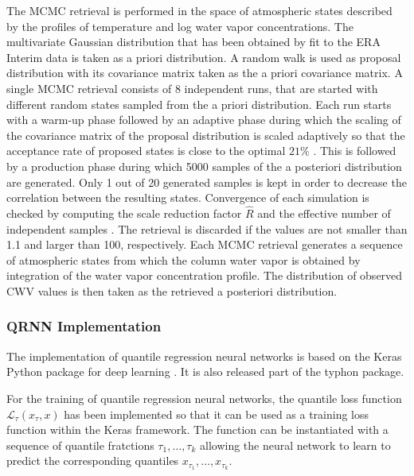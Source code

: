 \documentclass[journal abbreviation, manuscript]{copernicus}
\begin{document}
  The MCMC retrieval is performed in the space of atmospheric states described
  by the profiles of temperature and log water vapor concentrations. The
  multivariate Gaussian distribution that has been obtained by fit to the ERA
  Interim data is taken as a priori distribution. A random walk is used as
  proposal distribution with its covariance matrix taken as the a priori
  covariance matrix. A single MCMC retrieval consists of 8 independent runs,
  that are started with different random states sampled from the a priori
  distribution. Each run starts with a warm-up phase followed by an adaptive
  phase during which the scaling of the covariance matrix of the proposal
  distribution is scaled adaptively so that the acceptance rate of proposed states is
  close to the optimal $21\%$ \citep{bda}. This is followed by a production
  phase during which 5000 samples of the a posteriori distribution are
  generated. Only 1 out of 20 generated samples is kept in order to decrease the
  correlation between the resulting states. Convergence of each simulation is
  checked by computing the scale reduction factor $\hat{R}$ and the effective
  number of independent samples \citep[eqs. (11.12), (11.13)]{bda}. The
  retrieval is discarded if the values are not smaller than 1.1 and larger than
  100, respectively. Each MCMC retrieval generates a sequence of atmospheric
  states from which the column water vapor is obtained by integration of the
  water vapor concentration profile. The distribution of observed CWV values
  is then taken as the retrieved a posteriori distribution.

  
\subsubsection{QRNN Implementation}
\label{sec:implementation_qrnn}

  The implementation of quantile regression neural networks is based on the
  Keras Python package for deep learning \citep{keras}. It is also released
  part of the typhon package.

  For the training of quantile regression neural networks, the quantile loss
  function $\mathcal{L}_\tau(x_\tau, x)$ has been implemented so that it can be
  used as a training loss function within the Keras framework. The function can
  be instantiated with a sequence of quantile fratctions $\tau_1, \ldots,
  \tau_k$ allowing the neural network to learn to predict the corresponding
  quantiles $x_{\tau_1}, \ldots, x_{\tau_k}$.
\end{document}
